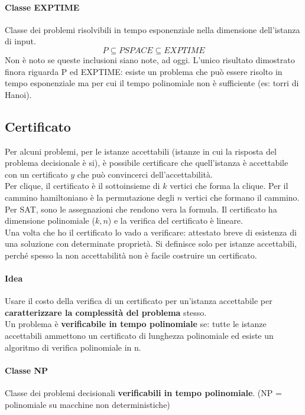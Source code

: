 \documentclass[10pt]{book}
\begin{document}
\paragraph{Classe EXPTIME} Classe dei problemi risolvibili in tempo esponenziale nella dimensione dell'istanza di input.
$$P\subseteq PSPACE \subseteq EXPTIME$$
Non è noto se queste inclusioni siano note, ad oggi. L'unico risultato dimostrato finora riguarda P ed EXPTIME: esiste un problema che può essere risolto in tempo esponenziale ma per cui il tempo polinomiale non è sufficiente (es: torri di Hanoi).
\subsection{Certificato}
Per alcuni problemi, per le istanze accettabili (istanze in cui la risposta del problema decisionale è si), è possibile certificare che quell'istanza è accettabile con un certificato $y$ che può convincerci dell'accettabilità.\\
Per clique, il certificato è il sottoinsieme di $k$ vertici che forma la clique. Per il cammino hamiltoniano è la permutazione degli $n$ vertici che formano il cammino. Per SAT, sono le assegnazioni che rendono vera la formula. Il certificato ha dimensione polinomiale ($k, n$) e la verifica del certificato è lineare.\\
Una volta che ho il certificato lo vado a verificare: attestato breve di esistenza di una soluzione con determinate proprietà. Si definisce solo per istanze accettabili, perché spesso la non accettabilità non è facile costruire un certificato.
\paragraph{Idea} Usare il costo della verifica di un certificato per un'istanza accettabile per \textbf{caratterizzare la complessità del problema} stesso.\\
Un problema è \textbf{verificabile in tempo polinomiale} se: tutte le istanze accettabili ammettono un certificato di lunghezza polinomiale ed esiste un algoritmo di verifica polinomiale in n.
\paragraph{Classe NP} Classe dei problemi decisionali \textbf{verificabili in tempo polinomiale}. (NP = polinomiale su macchine non deterministiche)
\end{document}
